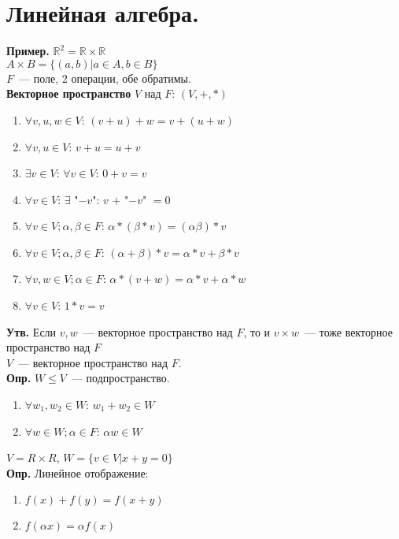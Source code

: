 \documentclass{article}
\begin{document}
	\tableofcontents
	\setcounter{tocdepth}{3}
	\newpage
	\section{Линейная алгебра.}
	\textbf{Пример.} $\mathbb{R}^2 = \mathbb{R} \times \mathbb{R}$ \\
	$A \times B = \{ (a, b) | a \in A, b \in B \}$ \\
	$F$~--- поле, $2$ операции, обе обратимы. \\
	\textbf{Векторное пространство} $V$ над $F$: $(V, +, *)$
	\begin{enumerate}
		\item $\forall v, u, w \in V$: $(v + u) + w = v + (u + w)$
		\item $\forall v, u \in V$: $v + u = u + v$
		\item $\exists v \in V$: $\forall v \in V$: $0 + v = v$
		\item $\forall v \in V$: $\exists$ "$-v$": $v$ $+$ "$-v$" $= 0$
		\item $\forall v \in V; \alpha, \beta \in F$: $\alpha * (\beta * v) = (\alpha \beta) * v$
		\item $\forall v \in V; \alpha, \beta \in F$: $(\alpha + \beta) * v = \alpha * v + \beta * v$
		\item $\forall v, w \in V; \alpha \in F$: $\alpha * (v + w) = \alpha * v + \alpha * w$
		\item $\forall v \in V$: $1 * v = v$
	\end{enumerate}
	\textbf{Утв.} Если $v, w$~--- векторное пространство над $F$, то и $v \times w$~--- тоже векторное пространство над $F$ \\
	$V$~--- векторное пространство над $F$. \\
	\textbf{Опр.} $W \leqslant V$~--- подпространство.
	\begin{enumerate}
		\item $\forall w_1, w_2 \in W$: $w_1 + w_2 \in W$
		\item $\forall w \in W; \alpha \in F$: $\alpha w \in W$
	\end{enumerate}
	$V = R \times R$, $W = \{ v \in V | x + y = 0 \}$ \\
	\textbf{Опр.} Линейное отображение:
	\begin{enumerate}
		\item $f(x) + f(y) = f(x + y)$
		\item $f(\alpha x) = \alpha f(x)$
	\end{enumerate}
\end{document}
